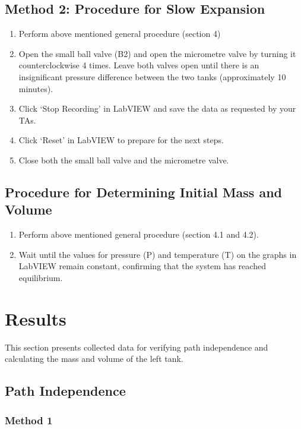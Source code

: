 \documentclass[titlepage, twocolumn, 12pt]{article}
\begin{document}
\subsection{Method 2: Procedure for Slow Expansion}

\begin{enumerate}
    \item Perform above mentioned general procedure (section 4)
    \item Open the small ball valve (B2) and open the micrometre valve by turning it counterclockwise 4 times. Leave both valves open until there is an insignificant pressure difference between the two tanks (approximately 10 minutes).
    \item Click ‘Stop Recording’ in LabVIEW and save the data as requested by your TAs.
    \item Click ‘Reset’ in LabVIEW to prepare for the next steps.
    \item Close both the small ball valve and the micrometre valve.
\end{enumerate}

\subsection{Procedure for Determining Initial Mass and Volume}
\begin{enumerate}
    \item Perform above mentioned general procedure (section 4.1 and 4.2).
    \item Wait until the values for pressure (P) and temperature (T) on the graphs in LabVIEW remain constant, confirming that the system has reached equilibrium.
\end{enumerate}



\section{Results}
This section presents collected data for verifying path independence and calculating the mass and volume of the left tank.
\subsection{Path Independence}

\subsubsection{Method 1}
\end{document}
